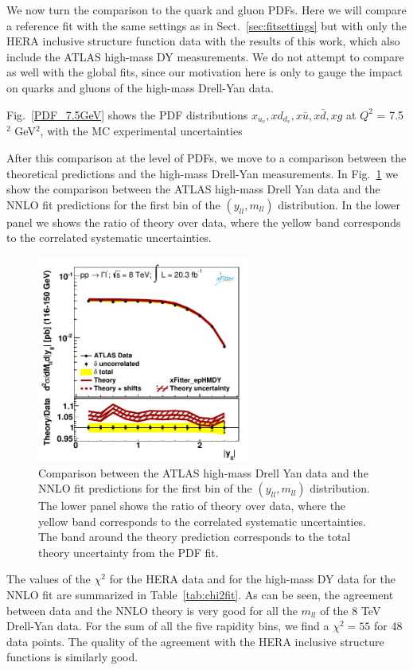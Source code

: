 We now turn the comparison to the quark and gluon PDFs.
%
Here we will compare a reference fit with the same settings as in Sect.~\ref{sec:fitsettings}
but with only the HERA inclusive structure function data with the results of this work,
which also include the ATLAS high-mass DY measurements.
%
We do not attempt to compare as well with the global fits, since our motivation here is only to
gauge the impact on quarks and gluons of the high-mass Drell-Yan data.

Fig.~\ref{PDF_7.5GeV}
shows the PDF distributions $x_{u_v},xd_{d_v},x\bar{u}, x\bar{d}, xg$ at $Q^{2}$ = 7.5$^{2}$ GeV$^{2}$,
with the MC experimental uncertainties

After this comparison at the level of PDFs, we move to a comparison between the theoretical
predictions and the high-mass Drell-Yan measurements.
%
In Fig.~\ref{hmDY_2D} we show the
comparison between the ATLAS high-mass Drell Yan data and the NNLO fit predictions
for the first bin of the $(y_{ll},m_{ll})$ distribution.
%
In the lower panel we shows the ratio of theory over data, where the yellow band
  corresponds to the correlated systematic uncertainties.

\begin{figure}[h]
\centering
\includegraphics[width=7cm]{figs/data_1.pdf} 
\caption{Comparison between the ATLAS high-mass Drell Yan data and the NNLO fit predictions
  for the first bin of the $(y_{ll},m_{ll})$ distribution.
  The lower panel shows the ratio of theory over data, where the yellow band
  corresponds to the correlated systematic uncertainties.
  The band around the theory prediction corresponds to the total
  theory uncertainty from the PDF fit.
}
\label{hmDY_2D}
\end{figure}

The values of the $\chi^2$ for the HERA data and for
the high-mass DY data for the NNLO fit
are summarized in Table~\ref{tab:chi2fit}.
%
As can be seen, the agreement between data and the NNLO theory
is very good for all the $m_{ll}$ of the 8 TeV Drell-Yan data.
%
For the sum of all the five rapidity bins, we find a $\chi^2=55$
for 48 data points.
%
The quality of the agreement with the HERA inclusive structure functions
is similarly good.

